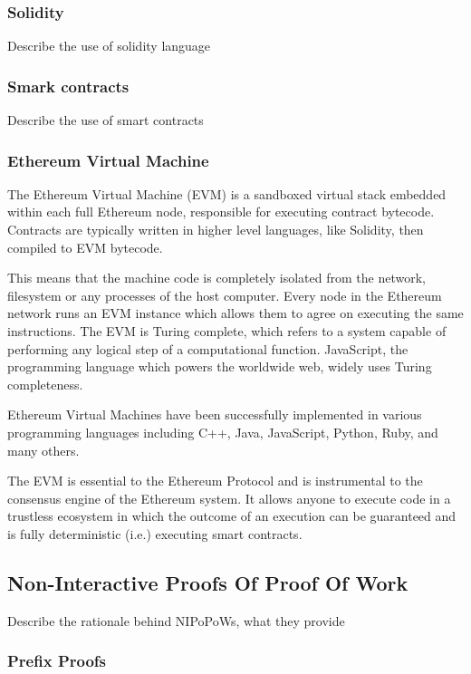\documentclass{article}
\begin{document}
  \subsubsection{Solidity}

  Describe the use of solidity language

  \subsubsection{Smark contracts}

  Describe the use of smart contracts

  \subsubsection{Ethereum Virtual Machine}

  The Ethereum Virtual Machine (EVM) is a sandboxed virtual stack
  embedded within each full Ethereum node, responsible for executing
  contract bytecode. Contracts are typically written in higher level
  languages, like Solidity, then compiled to EVM bytecode.

  This means that the machine code is completely isolated from the
  network, filesystem or any processes of the host computer. Every node
  in the Ethereum network runs an EVM instance which allows them to
  agree on executing the same instructions. The EVM is Turing complete,
  which refers to a system capable of performing any logical step of a
  computational function. JavaScript, the programming language which
  powers the worldwide web, widely uses Turing completeness.

  Ethereum Virtual Machines have been successfully implemented in
  various programming languages including C++, Java, JavaScript, Python,
  Ruby, and many others.

  The EVM is essential to the Ethereum Protocol and is instrumental to
  the consensus engine of the Ethereum system. It allows anyone to
  execute code in a trustless ecosystem in which the outcome of an
  execution can be guaranteed and is fully deterministic (i.e.)
  executing smart contracts.

  \subsection{Non-Interactive Proofs Of Proof Of Work}

  Describe the rationale behind NIPoPoWs, what they provide

  \subsubsection{Prefix Proofs}
\end{document}
